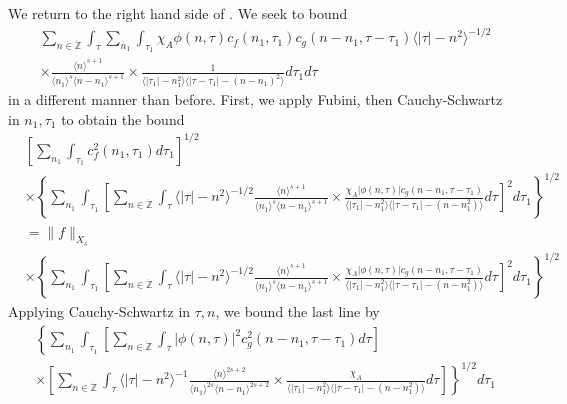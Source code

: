 \documentclass[12pt,reqno]{amsart}
\numberwithin{equation}{section}  %
\renewcommand{\cref}{\Cref}
\newcommand{\zz}{\mathbb{Z}}
\newcommand{\zzdot}{\dot{\zz}}
\begin{document}
%
%
We return to the right hand side of \cref{pre-fubini-int-form}.
We seek to bound
\begin{equation*}
\begin{split}
  & \sum_{n \in \zzdot} \int_{\tau}  \sum_{n_{1}}
  \int_{\tau_{1}} \chi_{A} \phi(n, \tau)
    c_f(n_1, \tau_1)
    c_g(n - n_1, \tau - \tau_1 ) \langle | \tau | - n^{2} \rangle ^{-1/2}
		\\
    & \times \frac{\langle n \rangle ^{s+1}}{\langle n_{1} \rangle ^{s} \langle
    n-n_{1} \rangle ^{s+1}} \times \frac{1}{\langle |\tau_{1}| - n_{1}^{2} \rangle
    \langle |\tau - \tau_{1}|-(n - n_{1})^{2} \rangle } d \tau_1 d \tau 
   \end{split}
\end{equation*}
in a different manner than before. First, we apply 
Fubini, then Cauchy-Schwartz in $n_{1}, \tau_{1}$ to obtain the bound
%
%
\begin{equation*}
\begin{split}
  & \left[ \sum_{n_{1}} \int_{\tau_{1}} c_{f}^{2}(n_{1}, \tau_{1}) d \tau_{1}
  \right]^{1/2}
  \\
  & \times \left \{\sum_{n_{1}} \int_{\tau_{1}}   
 \left[
 \sum_{n \in \zzdot} \int_{\tau} \langle | \tau | - n^{2} \rangle ^{-1/2}
   \frac{\langle n \rangle ^{s+1}}{\langle n_{1} \rangle ^{s} \langle
    n-n_{1} \rangle ^{s+1}} 
   \times \frac{\chi_{A} |\phi(n, \tau)| c_{g}(n -
   n_{1}, \tau - \tau_{1})
}{\langle | \tau_{1} | - n_{1}^{2} \rangle \langle | \tau -
  \tau_{1} | - (n - n_{1}^{2}) \rangle} d \tau 
  \right]^{2} d \tau_{1} \right \}^{1/2}
  \\
  & = \| f \|_{X_{s}}
  \\
  & \times \left \{\sum_{n_{1}} \int_{\tau_{1}}   
 \left[
 \sum_{n \in \zzdot} \int_{\tau} \langle | \tau | - n^{2} \rangle ^{-1/2}
   \frac{\langle n \rangle ^{s+1}}{\langle n_{1} \rangle ^{s} \langle
    n-n_{1} \rangle ^{s+1}} 
   \times \frac{\chi_{A}|\phi(n, \tau)| c_{g}(n -
   n_{1}, \tau - \tau_{1}) 
}{\langle | \tau_{1} | - n_{1}^{2} \rangle \langle | \tau -
  \tau_{1} | - (n - n_{1}^{2}) \rangle} d \tau 
  \right]^{2} d \tau_{1}  \right \}^{1/2}
\end{split}
\end{equation*}
%
Applying Cauchy-Schwartz in $\tau, n$, we bound the last line by 
%
%
\begin{equation*}
\begin{split}
  & \left \{\sum_{n_{1}} \int_{\tau_{1}}   
  \left [ \sum_{n \in \zzdot} \int_{\tau}
  | \phi(n, \tau)|^{2} c_{g}^{2}(n - n_{1}, \tau - \tau_{1}) d \tau  
    \right ] \right . 
   \\
   & \left. \times \left [ \sum_{n \in \zzdot} \int_{\tau} 
\langle | \tau | - n^{2} \rangle ^{-1}
     \frac{\langle n \rangle
   ^{2s+2}}{\langle n_{1} \rangle ^{2s} \langle n - n_{1}\rangle ^{2s+2}}
   \times \frac{\chi_{A}}{\langle | \tau_{1} |
   - n_{1}^{2} \rangle  \langle | \tau - \tau_{1} | - (n - n_{1}^{2})
   \rangle} d \tau  \right ] \right \}^{1/2}d \tau_{1} 
\end{split}
\end{equation*}
\end{document}
